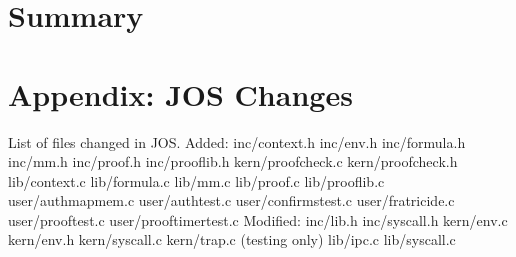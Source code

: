 \documentclass[10pt]{article}
\begin{document}
\section{Summary}

\section{Appendix: JOS Changes}
List of files changed in JOS. \newline
\newline
Added:\newline
inc/context.h \newline
inc/env.h \newline
inc/formula.h \newline
inc/mm.h \newline
inc/proof.h \newline
inc/prooflib.h \newline
kern/proofcheck.c \newline
kern/proofcheck.h \newline
lib/context.c \newline
lib/formula.c \newline
lib/mm.c \newline
lib/proof.c \newline
lib/prooflib.c \newline
user/authmapmem.c \newline
user/authtest.c \newline
user/confirmstest.c \newline
user/fratricide.c \newline
user/prooftest.c \newline
user/prooftimertest.c \newline
\newline
Modified: \newline
inc/lib.h \newline
inc/syscall.h \newline
kern/env.c \newline
kern/env.h \newline
kern/syscall.c \newline
kern/trap.c (testing only) \newline
lib/ipc.c \newline
lib/syscall.c \newline



\end{document}
